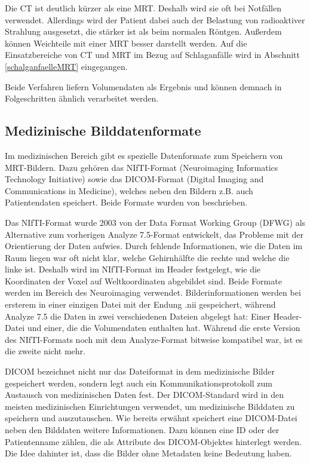Die CT ist deutlich kürzer als eine MRT. Deshalb wird sie oft bei Notfällen verwendet. Allerdings wird der Patient dabei auch der Belastung von radioaktiver Strahlung ausgesetzt, die stärker ist als beim normalen Röntgen. Außerdem können Weichteile mit einer MRT besser darstellt werden. \cite{ct2}
Auf die Einsatzbereiche von CT und MRT im Bezug auf Schlaganfälle wird in Abschnitt \ref{schalganfaelleMRT} eingegangen.

Beide Verfahren liefern Volumendaten als Ergebnis und können demnach in Folgeschritten ähnlich verarbeitet werden.

\subsection{Medizinische Bilddatenformate}
\label{datenformate}
Im medizinischen Bereich gibt es spezielle Datenformate zum Speichern von MRT-Bildern. Dazu gehören das NIfTI-Format (Neuroimaging Informatics Technology Initiative) sowie das DICOM-Format (Digital Imaging and Communications in Medicine), welches neben den Bildern z.B. auch Patientendaten speichert. Beide Formate wurden von \cite{Larobina13} beschrieben.

Das NIfTI-Format wurde 2003 von der Data Format Working Group (DFWG) als Alternative zum vorherigen Analyze 7.5-Format entwickelt, das Probleme mit der Orientierung der Daten aufwies. Durch fehlende Informationen, wie die Daten im Raum liegen war oft nicht klar, welche Gehirnhälfte die rechte und welche die linke ist. Deshalb wird im NIfTI-Format im Header festgelegt, wie die Koordinaten der Voxel auf Weltkoordinaten abgebildet sind. Beide Formate werden im Bereich des Neuroimaging verwendet.
Bilderinformationen werden bei ersterem in einer einzigen Datei mit der Endung .nii gespeichert, während Analyze 7.5 die Daten in zwei verschiedenen Dateien abgelegt hat: Einer Header-Datei und einer, die die Volumendaten enthalten hat. Während die erste Version des NIfTI-Formats noch mit dem Analyze-Format bitweise kompatibel war, ist es die zweite nicht mehr. 
 

DICOM bezeichnet nicht nur das Dateiformat in dem medizinische Bilder gespeichert werden, sondern  legt auch ein Kommunikationsprotokoll zum Austausch von medizinischen Daten fest. Der DICOM-Standard wird in den meisten medizinischen Einrichtungen verwendet, um medizinische Bilddaten zu speichern und auszutauschen.
Wie bereits erwähnt speichert eine DICOM-Datei neben den Bilddaten weitere Informationen. Dazu können eine ID oder der Patientenname zählen, die als Attribute des DICOM-Objektes hinterlegt werden. Die Idee dahinter ist, dass die Bilder ohne Metadaten keine Bedeutung haben. 

